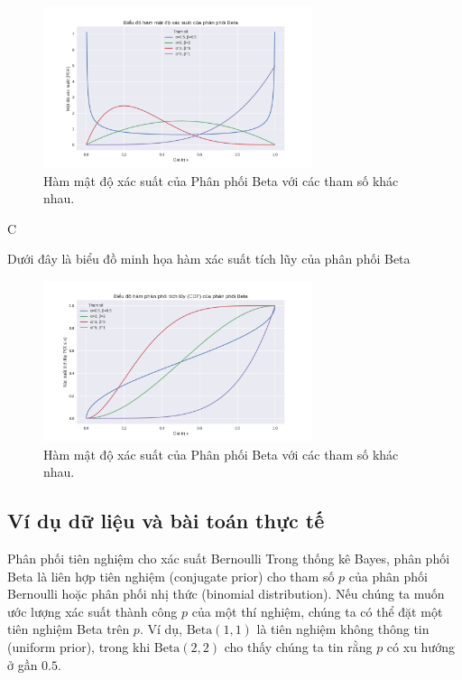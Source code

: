 	\begin{figure}[h!]
		\centering
		\includegraphics[width=0.7\textwidth]{images/Beta Distribution-PDF.png} %
		\caption{Hàm mật độ xác suất của Phân phối Beta với các tham số khác nhau.}
		\label{fig:Beta Distribution-PDF}
	\end{figure}C
	
	Dưới đây là biểu đồ minh họa hàm xác suất tích lũy của phân phối Beta
	
		\begin{figure}[h!]
		\centering
		\includegraphics[width=0.7\textwidth]{images/Beta Distribution-CDF.png} %
		\caption{Hàm mật độ xác suất của Phân phối Beta với các tham số khác nhau.}
		\label{fig:Beta Distribution-CDF}
	\end{figure}
	
	\subsection{Ví dụ dữ liệu và bài toán thực tế}
		Phân phối tiên nghiệm cho xác suất Bernoulli
		Trong thống kê Bayes, phân phối Beta là liên hợp tiên nghiệm (conjugate prior) cho tham số $p$ của phân phối Bernoulli hoặc phân phối nhị thức (binomial distribution). Nếu chúng ta muốn ước lượng xác suất thành công $p$ của một thí nghiệm, chúng ta có thể đặt một tiên nghiệm Beta trên $p$. Ví dụ, $\text{Beta}(1,1)$ là tiên nghiệm không thông tin (uniform prior), trong khi $\text{Beta}(2,2)$ cho thấy chúng ta tin rằng $p$ có xu hướng ở gần $0.5$.
	
